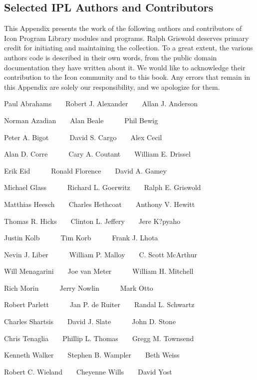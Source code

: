 \subsection{Selected IPL Authors and Contributors}
This Appendix presents the work of the following authors and
contributors of Icon Program Library modules and programs. Ralph
Griswold deserves primary credit for initiating and maintaining the
collection. To a great extent, the various authors{\textquotesingle}
code is described in their own words, from the public domain
documentation they have written about it. We would like to acknowledge
their contribution to the Icon community and to this book. Any errors
that remain in this Appendix are solely our responsibility, and we
apologize for them.


\bigskip

Paul Abrahams\ \ \ \ Robert J. Alexander\ \ \ \ Allan J. Anderson

Norman Azadian\ \ \ \ Alan Beale\ \ \ \ \ \ Phil Bewig

Peter A. Bigot\ \ \ \ \ \ David S. Cargo\ \ \ \ Alex Cecil

Alan D. Corre\ \ \ \ \ \ Cary A. Coutant\ \ \ \ William E. Drissel

Erik Eid\ \ \ \ \ \ Ronald Florence\ \ \ \ David A. Gamey

Michael Glass\ \ \ \ \ \ Richard L. Goerwitz\ \ \ \ Ralph E. Griswold

Matthias Heesch\ \ \ \ Charles Hethcoat\ \ \ \ Anthony V. Hewitt

Thomas R. Hicks\ \ \ \ Clinton L. Jeffery\ \ \ \ Jere K?pyaho

Justin Kolb\ \ \ \ \ \ Tim Korb\ \ \ \ \ \ Frank J. Lhota

Nevin J. Liber\ \ \ \ \ \ William P. Malloy\ \ \ \ C. Scott McArthur

Will Menagarini\ \ \ \ Joe van Meter\ \ \ \ \ \ William H. Mitchell

Rich Morin\ \ \ \ \ \ Jerry Nowlin\ \ \ \ \ \ Mark Otto

Robert Parlett\ \ \ \ \ \ Jan P. de Ruiter\ \ \ \ Randal L. Schwartz

Charles Shartsis\ \ \ \ David J. Slate\ \ \ \ \ \ John D. Stone

Chris Tenaglia\ \ \ \ Phillip L. Thomas\ \ \ \ Gregg M. Townsend

Kenneth Walker\ \ \ \ Stephen B. Wampler\ \ \ \ Beth Weiss

Robert C. Wieland\ \ \ \ Cheyenne Wills\ \ \ \ David Yost

